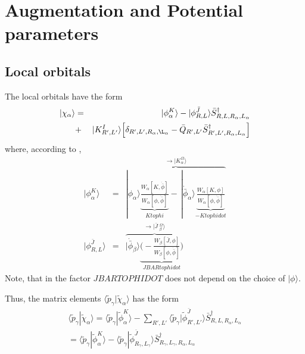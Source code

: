 \documentclass[11pt,a4paper]{report}
\begin{document}
\section{Augmentation and Potential parameters}
\subsection{Local orbitals}
The local orbitals have the form
\begin{eqnarray}
|\chi_\alpha\rangle&=&|\phi^K_\alpha\rangle
- |\phi^{\bar{J}}_{R,L}\rangle \bar{S}^\dagger_{R,L,R_\alpha,L_\alpha}
\nonumber\\
&+&|K^I_{R',L'}\rangle\Bigl[ \delta_{R',L',R_\alpha,\L_\alpha}-\bar{Q}_{R',L'}
\bar{S}^\dagger_{R',L',R_\alpha,L_\alpha}\Bigr]
\end{eqnarray}
where, according to ,
\begin{eqnarray}
|\phi^K_\alpha\rangle&=&
\overbrace{
|\phi_\alpha\rangle 
\underbrace{
\frac{W_\alpha[K,\dot{\bar{\phi}}]}{W_\alpha[\phi,\dot{\bar{\phi}}]}}_{Ktophi}
-\,|\dot{\bar{\phi}}_\alpha\rangle 
\underbrace{\frac{W_\alpha[K,\phi]}{W_\alpha[\phi,\dot{\bar{\phi}}]}}_{-Ktophidot}
}^{\rightarrow |K^\Omega_\alpha\rangle}
\nonumber\\
|\phi^{\bar{J}}_{R,L}\rangle
&=&\overbrace{
|\dot{\bar{\phi}}_\beta\rangle 
\underbrace{\biggl(-\frac{W_\beta[\bar{J},\phi]}{W_\beta[\phi,\dot{\bar{\phi}}]}\biggr)}_{JBARtophidot}
}^{\rightarrow |\bar{J}\;^\Omega_\beta\rangle}
\end{eqnarray}
Note, that in the factor $JBARTOPHIDOT$ does not depend on the choice
of $|\phi\rangle$.

Thus, the matrix elements
$\langle\tilde{p}_\gamma|\tilde{\chi}_\alpha\rangle$ has the form
\begin{eqnarray}
\langle\tilde{p}_\gamma|\tilde{\chi}_\alpha\rangle
=\langle\tilde{p}_\gamma|\tilde{\phi}^K_\alpha\rangle
-\sum_{R',L'}\langle\tilde{p}_\gamma|\tilde{\phi}^{\bar{J}}_{R',L'}\rangle
\bar{S}^\dagger_{R,L,R_\alpha,L_\alpha}
\nonumber\\
=\langle\tilde{p}_\gamma|\tilde{\phi}^K_\alpha\rangle
-\langle\tilde{p}_\gamma|\tilde{\phi}^{\bar{J}}_{R_\gamma,L_\gamma}\rangle
\bar{S}^\dagger_{R_\gamma,L_\gamma,R_\alpha,L_\alpha}
\end{eqnarray}
\end{document}
